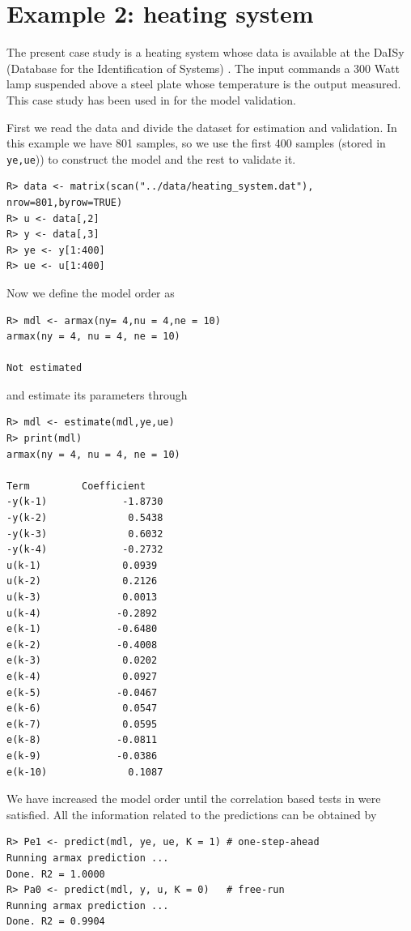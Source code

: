 \documentclass[preprint,12pt, a4paper]{elsarticle}
\begin{document}
\section{Example 2: heating system}

The present case study is a heating system whose data is available at the DaISy (Database for the Identification of Systems) \cite{Moor2019}. The input commands a 300 Watt lamp suspended above a steel plate whose temperature is the output measured. This case study has been used in \cite{Dullerud96} for the model validation.

First we read the data and divide the dataset for estimation and validation. In this example we have 801 samples, so we use the first 400 samples (stored in \verb|ye,ue|)) to construct the model and the rest to validate it.

\begin{verbatim}
R> data <- matrix(scan("../data/heating_system.dat"),
nrow=801,byrow=TRUE)
R> u <- data[,2]
R> y <- data[,3]
R> ye <- y[1:400]
R> ue <- u[1:400]
\end{verbatim}

Now we define the model order as

\begin{verbatim}
R> mdl <- armax(ny= 4,nu = 4,ne = 10)
armax(ny = 4, nu = 4, ne = 10)

Not estimated
\end{verbatim}

and estimate its parameters through

\begin{verbatim}
R> mdl <- estimate(mdl,ye,ue)
R> print(mdl)
armax(ny = 4, nu = 4, ne = 10)

Term         Coefficient
-y(k-1)             -1.8730
-y(k-2)              0.5438
-y(k-3)              0.6032
-y(k-4)             -0.2732
u(k-1)              0.0939
u(k-2)              0.2126
u(k-3)              0.0013
u(k-4)             -0.2892
e(k-1)             -0.6480
e(k-2)             -0.4008
e(k-3)              0.0202
e(k-4)              0.0927
e(k-5)             -0.0467
e(k-6)              0.0547
e(k-7)              0.0595
e(k-8)             -0.0811
e(k-9)             -0.0386
e(k-10)              0.1087
\end{verbatim}

We have increased the model order until the correlation based tests in were satisfied. All the information related to the predictions can be obtained by 

\begin{verbatim}
R> Pe1 <- predict(mdl, ye, ue, K = 1) # one-step-ahead
Running armax prediction ... 
Done. R2 = 1.0000
R> Pa0 <- predict(mdl, y, u, K = 0)   # free-run
Running armax prediction ... 
Done. R2 = 0.9904          
\end{verbatim}
\end{document}
